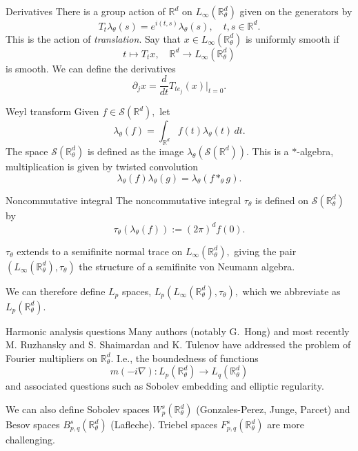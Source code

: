 \documentclass{beamer}
\numberwithin{equation}{section}
\theoremstyle{plain}
\theoremstyle{plain}
\theoremstyle{definition}
\theoremstyle{plain}
\theoremstyle{plain}
\theoremstyle{definition}
\newcommand{\Rl}{\mathbb{R}}
\newcommand{\Sc}{\mathcal{S}}
\begin{document}
\begin{frame}{Derivatives}
    There is a group action of $\Rl^d$ on $L_\infty(\Rl^d_\theta)$ given on the generators by
    \[
        T_{t}\lambda_\theta(s) = e^{i(t,s)}\lambda_\theta(s),\quad t,s\in \Rl^d.
    \]
    This is the action of \emph{translation}. Say that $x \in L_{\infty}(\Rl^d_\theta)$ is uniformly smooth if
    \[
        t\mapsto T_tx,\quad \Rl^d\to L_{\infty}(\Rl^d_\theta)
    \]
    is smooth. We can define the derivatives
    \[
        \partial_jx = \frac{d}{dt} T_{te_j}(x)|_{t=0}.
    \]
\end{frame}

\begin{frame}{Weyl transform}
    Given $f \in \Sc(\Rl^d),$ let
    \[
        \lambda_\theta(f) = \int_{\Rl^d} f(t)\lambda_\theta(t)\,dt.
    \]
    The space $\Sc(\Rl^d_\theta)$ is defined as the image $\lambda_\theta(\Sc(\Rl^d)).$ This is a $*$-algebra, multiplication is given by twisted convolution
    \[
        \lambda_\theta(f)\lambda_\theta(g) = \lambda_\theta(f\ast_\theta g).
    \]
\end{frame}

\begin{frame}{Noncommutative integral}
    The noncommutative integral $\tau_\theta$ is defined on $\Sc(\Rl^d_\theta)$ by
    \[
        \tau_\theta(\lambda_\theta(f)) := (2\pi)^d f(0).
    \]
    \begin{theorem}
        $\tau_\theta$ extends to a semifinite normal trace on $L_{\infty}(\Rl^d_\theta),$ giving the pair $(L_{\infty}(\Rl^d_\theta),\tau_\theta)$ the structure of a semifinite von Neumann algebra.
    \end{theorem}
    We can therefore define $L_p$ spaces, $L_p(L_{\infty}(\Rl^d_\theta),\tau_\theta),$ which we abbreviate as $L_p(\Rl^d_\theta).$
\end{frame}

\begin{frame}{Harmonic analysis questions}
    Many authors (notably G.~Hong) and most recently M. Ruzhansky and S. Shaimardan and K. Tulenov have addressed the problem of Fourier multipliers on $\Rl^d_\theta.$ I.e., the boundedness of functions
    \[
        m(-i\nabla):L_p(\Rl^d_\theta)\to L_{q}(\Rl^d_\theta)
    \]
    and associated questions such as Sobolev embedding and elliptic regularity.\pause

    We can also define Sobolev spaces $W^s_p(\Rl^d_\theta)$ (Gonzales-Perez, Junge, Parcet) and Besov spaces $B^s_{p,q}(\Rl^d_\theta)$ (Lafleche). Triebel spaces $F^s_{p,q}(\Rl^d_\theta)$ are more challenging.
\end{frame}
\end{document}
